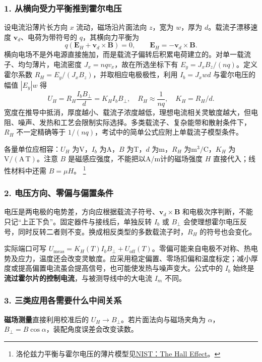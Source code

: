 \subsubsection*{1. 从横向受力平衡推到霍尔电压}
设电流沿薄片长方向 $x$ 流动，磁场沿片面法向 $z$，宽为 $w$，厚为 $d$。载流子漂移速度 $\mathbf v_d$、电荷为带符号的 $q$，其横向力平衡为
\[
q(\mathbf E_H+\mathbf v_d\times\mathbf B)=0,
\qquad \mathbf E_H=-\mathbf v_d\times\mathbf B.
\]
横向电场不是外电源直接施加，而是载流子偏转后积累电荷建立的。对单一载流子、均匀薄片，电流密度 $J_x=nqv_x$，故在所选坐标下有 $E_y=J_xB_z/(nq)$。定义霍尔系数 $R_H=E_y/(J_xB_z)$，并取相应电极极性，利用 $I_b=J_xwd$ 与霍尔电压的幅值 $|E_y|w$ 得
\[
\boxed{U_H=R_H\frac{I_bB_\perp}{d}=K_HI_bB_\perp},
\quad R_H\approx\frac{1}{nq},\quad K_H=R_H/d.
\]
宽度在推导中抵消，厚度越小、载流子浓度越低，理想电流相关灵敏度越大，但电阻、噪声、发热和工艺会限制实际选择。多类载流子、复杂能带和散射条件下，$R_H$ 不一定精确等于 $1/(nq)$，考试中的简单公式应附上单载流子模型条件。

各量单位应相容：$U_H$ 为V，$I_b$ 为A，$B$ 为T，$d$ 为m，$R_H$ 为$\mathrm m^3/\mathrm C$，$K_H$ 为$\mathrm{V/(A\,T)}$。注意 $B$ 是磁感应强度，不能把以A/m计的磁场强度 $H$ 直接代入；线性材料中还需 $B=\mu H$。
\footnote{洛伦兹力平衡与霍尔电压的薄片模型见\href{https://www.nist.gov/pml/nanoscale-device-characterization-division/popular-links/hall-effect/hall-effect}{NIST：The Hall Effect}。}

\subsubsection*{2. 电压方向、零偏与偏置条件}
电压是两电极的电势差，方向应根据载流子符号、$\mathbf v_d\times\mathbf B$ 和电极次序判断，不能只记“上正下负”。固定器件与接线后，单独反转 $I_b$ 或 $B_\perp$ 会使理想霍尔电压反号，同时反转二者则不变。换成相反类型的多数载流子时，$R_H$ 的符号也会变化。

实际端口可写 $U_{\mathrm{meas}}=K_H(T)I_bB_\perp+U_{\mathrm{off}}(T)$。零偏可能来自电极不对称、热电势及应力，温度还会改变灵敏度。应采用稳定偏置、零场扣偏和温度标定；减小厚度或提高偏置电流虽会提高信号，也可能使发热与噪声变大。公式中的 $I_b$ 始终是\textbf{流过霍尔片的控制电流}，与被测导线中的大电流 $I_m$ 不同。

\subsubsection*{3. 三类应用各需要什么中间关系}
\textbf{磁场测量}直接利用校准后的 $U_H\to B_\perp$。若片面法向与磁场夹角为 $\alpha$，$B_\perp=B\cos\alpha$，装配角度误差会改变读数。

